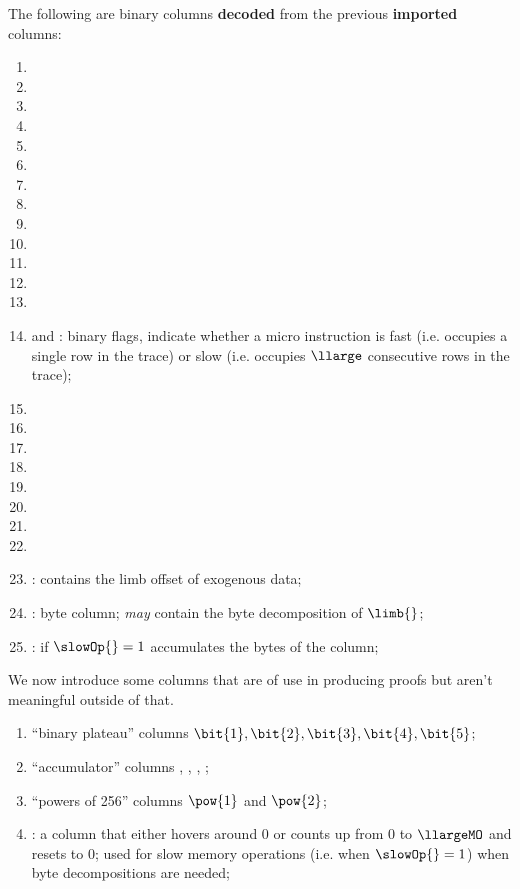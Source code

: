 The following are binary columns \textbf{decoded} from the previous \textbf{imported} columns: 
\begin{enumerate}[resume]
	\item \isMmioInstLimbVanishes{}                           
	\item \isMmioInstLimbToRamTransplant{}     
	\item \isMmioInstLimbToRamOneTarget{}
	\item \isMmioInstLimbToRamTwoTarget{}          
	\item \isMmioInstRamToLimbTransplant{} 
	\item \isMmioInstRamToLimbOneSource{}
	\item \isMmioInstRamToLimbTwoSource{}
	\item \isMmioInstRamToRamTransplant{}     
	\item \isMmioInstRamToRamPartial{}
	\item \isMmioInstRamToRamTwoTarget{}
	\item \isMmioInstRamToRamTwoSource{}
	\item \isMmioInstRamExcision{}                
	\item \isMmioInstRamVanishes{}            
	\item \fastOp{} and \slowOp{}:
		binary flags, indicate whether a micro instruction is
		fast (i.e. occupies a single row in the trace) or
		slow (i.e. occupies $\llarge$ consecutive rows in the trace);
	\item \isExoFlagRom         {}
	\item \isExoFlagKec         {}
	\item \isExoFlagLog         {}
	\item \isExoFlagRlpTxn      {}
	\item \isExoFlagEcdata      {}
	\item \isExoFlagRipSha      {}
	\item \isExoFlagBlakeModexp {}
	\item \isExoFlagBlsdata     {}
	\item \indexX{}: contains the limb offset of exogenous data;
	\item \byteLimb{}: byte column; \emph{may} contain the byte decomposition of $\limb{}$;
	\item {}: if $\slowOp{} = 1$ accumulates the bytes of the \byteLimb{} column;
\end{enumerate}
We now introduce some columns that are of use in producing proofs but aren't meaningful outside of that.
\begin{enumerate}[resume]
 	\item ``binary plateau'' columns $\bit{1}, \bit{2}, \bit{3}, \bit{4}, \bit{5}$;
 	\item ``accumulator'' columns , , , ;
 	\item ``powers of 256'' columns $\pow{1}$ and $\pow{2}$;
 	\item \CT{}: a column that either hovers around 0 or counts up from 0 to $\llargeMO$ and resets to 0; used for slow memory operations (i.e. when $\slowOp{}=1$) when byte decompositions are needed;
\end{enumerate}

